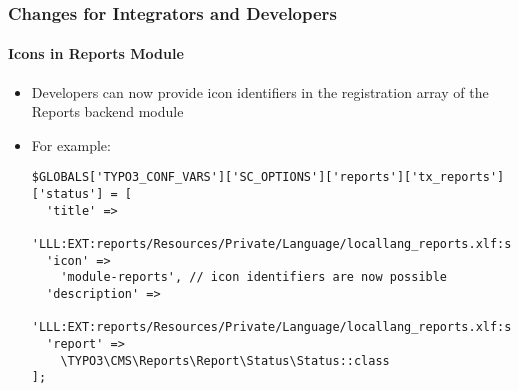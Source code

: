 %

\begin{frame}[fragile]
	\frametitle{Changes for Integrators and Developers}
	\framesubtitle{Icons in Reports Module}


	\begin{itemize}
		\item Developers can now provide icon identifiers in the registration
			array of the Reports backend module
		\item For example:
\begin{lstlisting}
$GLOBALS['TYPO3_CONF_VARS']['SC_OPTIONS']['reports']['tx_reports']['status'] = [
  'title' =>
    'LLL:EXT:reports/Resources/Private/Language/locallang_reports.xlf:status_report_title',
  'icon' =>
    'module-reports', // icon identifiers are now possible
  'description' =>
    'LLL:EXT:reports/Resources/Private/Language/locallang_reports.xlf:status_report_description',
  'report' =>
    \TYPO3\CMS\Reports\Report\Status\Status::class
];
\end{lstlisting}

	\end{itemize}

\end{frame}

